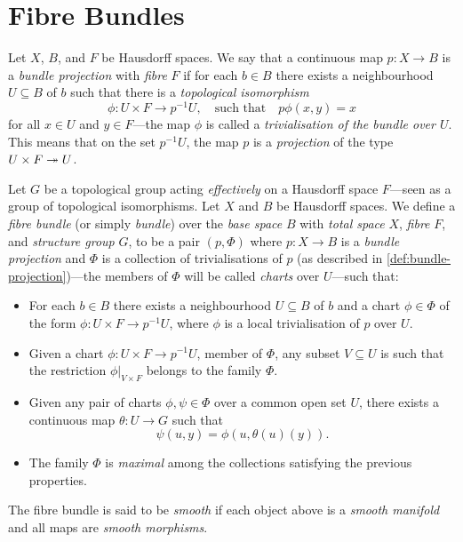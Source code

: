 \documentclass[../../../deep-dive]{subfile}
\begin{document}
\section{Fibre Bundles}

\begin{definition}
    \label{def:bundle-projection}
    Let \(X\), \(B\), and \(F\) be Hausdorff spaces. We say that a continuous map
    \(p: X \to B\) is a \emph{bundle projection} with \emph{fibre} \(F\) if for each
    \(b \in B\) there exists a neighbourhood \(U \subseteq B\) of \(b\) such that
    there is a \emph{topological isomorphism}
    \[
        \phi: U \times F \longrightarrow p^{-1} U,
        \quad\text{such that}\quad
        p \phi(x, y) = x
    \]
    for all \(x \in U\) and \(y \in F\)---the map \(\phi\) is called a
    \emph{trivialisation of the bundle over \(U\)}. This means that on the set
    \(p^{-1} U\), the map \(p\) is a \emph{projection} of the type
    \(U \times F \twoheadrightarrow U\).
\end{definition}

\begin{definition}
    \label{def:fibre-bundle}
    Let \(G\) be a topological group acting \emph{effectively} on a Hausdorff space
    \(F\)---seen as a group of topological isomorphisms. Let \(X\) and \(B\) be
    Hausdorff spaces. We define a \emph{fibre bundle} (or simply \emph{bundle}) over
    the \emph{base space} \(B\) with \emph{total space} \(X\), \emph{fibre} \(F\),
    and \emph{structure group} \(G\), to be a pair \((p, \Phi)\) where
    \(p: X \to B\) is a \emph{bundle projection} and \(\Phi\) is a collection of
    trivialisations of \(p\) (as described in \cref{def:bundle-projection})---the
    members of \(\Phi\) will be called \emph{charts} over \(U\)---such that:
    \begin{itemize}\setlength\itemsep{0em}
        \item For each \(b \in B\) there exists a neighbourhood \(U \subseteq B\) of
              \(b\) and a chart \(\phi \in \Phi\) of the form
              \(\phi: U \times F \to p^{-1} U\), where \(\phi\) is a local trivialisation of
              \(p\) over \(U\).

        \item Given a chart \(\phi: U \times F \to p^{-1} U\), member of \(\Phi\), any
              subset \(V \subseteq U\) is such that the restriction \(\phi|_{V \times F}\)
              belongs to the family \(\Phi\).

        \item Given any pair of charts \(\phi, \psi \in \Phi\) over a common open set
              \(U\), there exists a continuous map \(\theta: U \to G\) such that
              \[
                  \psi(u, y) = \phi(u, \theta(u)(y)).
              \]

        \item The family \(\Phi\) is \emph{maximal} among the collections satisfying the
              previous properties.
    \end{itemize}
    The fibre bundle is said to be \emph{smooth} if each object above is a
    \emph{smooth manifold} and all maps are \emph{smooth morphisms}.
\end{definition}
\end{document}

